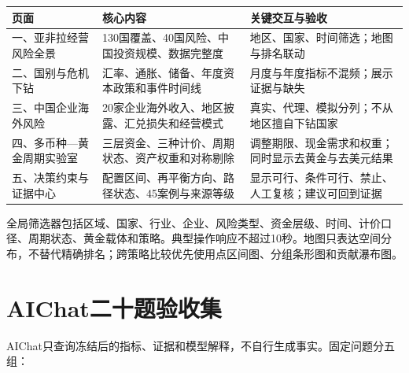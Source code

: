 \documentclass[UTF8,fontset=windows,12pt,openany]{ctexbook}
\begin{document}
\begin{longtable}{p{3.4cm}p{5.2cm}p{4.9cm}}
\toprule
\textbf{页面} & \textbf{核心内容} & \textbf{关键交互与验收}\\
\midrule
一、亚非拉经营风险全景 & 130国覆盖、40国风险、中国投资规模、数据完整度 & 地区、国家、时间筛选；地图与排名联动\\
二、国别与危机下钻 & 汇率、通胀、储备、年度资本政策和事件时间线 & 月度与年度指标不混频；展示证据与缺失\\
三、中国企业海外风险 & 20家企业海外收入、地区披露、汇兑损失和经营模式 & 真实、代理、模拟分列；不从地区擅自下钻国家\\
四、多币种—黄金周期实验室 & 三层资金、三种计价、周期状态、资产权重和对称剔除 & 调整期限、现金需求和权重；同时显示去黄金与去美元结果\\
五、决策约束与证据中心 & 配置区间、再平衡方向、路径状态、45案例与来源等级 & 显示可行、条件可行、禁止、人工复核；建议可回到证据\\
\bottomrule
\end{longtable}

全局筛选器包括区域、国家、行业、企业、风险类型、资金层级、时间、计价口径、周期状态、黄金载体和策略。典型操作响应不超过10秒。地图只表达空间分布，不替代精确排名；跨策略比较优先使用点区间图、分组条形图和贡献瀑布图。

\chapter{AIChat二十题验收集}

AIChat只查询冻结后的指标、证据和模型解释，不自行生成事实。固定问题分五组：
\end{document}

